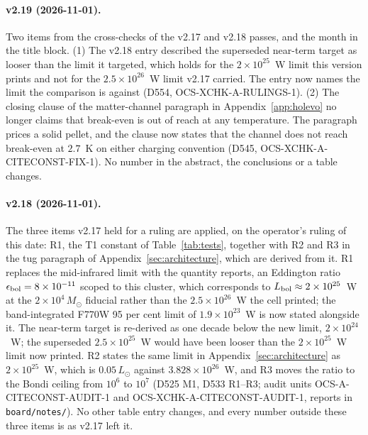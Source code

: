 \documentclass[11pt]{article}
\newcommand{\msun}{\ensuremath{M_\odot}}
\begin{document}
\paragraph{v2.19 (2026-11-01).} Two items from the cross-checks of the v2.17 and v2.18 passes, and the month in the title block. (1) The v2.18 entry described the superseded near-term target as looser than the limit it targeted, which holds for the $2\times10^{25}$~W limit this version prints and not for the $2.5\times10^{26}$~W limit v2.17 carried. The entry now names the limit the comparison is against (D554, OCS-XCHK-A-RULINGS-1). (2) The closing clause of the matter-channel paragraph in Appendix~\ref{app:holevo} no longer claims that break-even is out of reach at any temperature. The paragraph prices a solid pellet, and the clause now states that the channel does not reach break-even at $2.7$~K on either charging convention (D545, OCS-XCHK-A-CITECONST-FIX-1). No number in the abstract, the conclusions or a table changes.

\paragraph{v2.18 (2026-11-01).} The three items v2.17 held for a ruling are applied, on the operator's ruling of this date: R1, the T1 constant of Table~\ref{tab:tests}, together with R2 and R3 in the tug paragraph of Appendix~\ref{sec:architecture}, which are derived from it. R1 replaces the mid-infrared limit with the quantity \citet{Chen2025JWST} reports, an Eddington ratio $\epsilon_{\rm bol} = 8\times10^{-11}$ scoped to this cluster, which corresponds to $L_{\rm bol} \approx 2\times10^{25}$~W at the $2\times10^{4}\,\msun$ fiducial rather than the $2.5\times10^{26}$~W the cell printed; the band-integrated F770W 95 per cent limit of $1.9\times10^{23}$~W is now stated alongside it. The near-term target is re-derived as one decade below the new limit, $2\times10^{24}$~W; the superseded $2.5\times10^{25}$~W would have been looser than the $2\times10^{25}$~W limit now printed. R2 states the same limit in Appendix~\ref{sec:architecture} as $2\times10^{25}$~W, which is $0.05\,L_\odot$ against $3.828\times10^{26}$~W, and R3 moves the ratio to the Bondi ceiling from $10^{6}$ to $10^{7}$ (D525 M1, D533 R1--R3; audit units OCS-A-CITECONST-AUDIT-1 and OCS-XCHK-A-CITECONST-AUDIT-1, reports in \texttt{board/notes/}). No other table entry changes, and every number outside these three items is as v2.17 left it.
\end{document}
